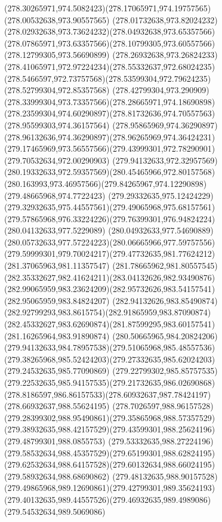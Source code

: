 {{		\curveto(278.30265971,974.5082423)(278.17065971,974.19757565)(278.00532638,973.90557565)
		\curveto(278.01732638,973.82024232)(278.02932638,973.73624232)(278.04932638,973.65357566)
		\curveto(278.07865971,973.63357566)(278.10799305,973.60557566)(278.12799305,973.56690899)
		\curveto(278.26932638,973.26824233)(278.41065971,972.97224234)(278.55332637,972.68024235)
		\curveto(278.5466597,972.73757568)(278.53599304,972.79624235)(278.52799304,972.85357568)
		\curveto(278.42799304,973.290909)(278.33999304,973.73357566)(278.28665971,974.18690898)
		\curveto(278.23599304,974.60290897)(278.81732636,974.70557563)(278.95599303,974.36157564)
		\curveto(278.95865969,974.36290897)(278.96132636,974.36290897)(278.96265969,974.36424231)
		\curveto(279.17465969,973.56557566)(279.43999301,972.78290901)(279.70532634,972.00290903)
		\curveto(279.94132633,972.32957569)(280.19332633,972.59357569)(280.45465966,972.80157568)
		\curveto(280.163993,973.46957566)(279.84265967,974.12290898)(279.48665968,974.7722423)
		\curveto(279.29332635,975.12424229)(279.32932635,975.44557561)(279.49065968,975.68157561)
		\curveto(279.57865968,976.33224226)(279.76399301,976.94824224)(280.04132633,977.5229089)
		\curveto(280.04932633,977.54690889)(280.05732633,977.57224223)(280.06665966,977.59757556)
		\curveto(279.59999301,979.70024217)(279.47732635,981.77624212)(281.37065963,981.11357547)
		\curveto(281.78665962,981.80557545)(282.35332627,982.41624211)(283.04132626,982.93490876)
		\curveto(282.99065959,983.23624209)(282.95732626,983.54157541)(282.95065959,983.84824207)
		\curveto(282.94132626,983.85490874)(282.92799293,983.8615754)(282.91865959,983.87090874)
		\curveto(282.45332627,983.62690874)(281.87599295,983.60157541)(281.16265964,983.91890874)
		\curveto(280.50665965,984.20824206)(279.94132633,984.78957538)(279.51065968,985.48557536)
		\curveto(279.38265968,985.52424203)(279.27332635,985.62024203)(279.24532635,985.77090869)
		\curveto(279.22799302,985.85757535)(279.22532635,985.94157535)(279.21732635,986.02690868)
		\curveto(278.8186597,986.86157533)(278.60932637,987.78424197)(278.66932637,988.55624195)
		\curveto(278.7026597,988.96157528)(279.28399302,988.95490861)(279.35865968,988.57357529)
		\curveto(279.38932635,988.42157529)(279.43599301,988.25624196)(279.48799301,988.0855753)
		\curveto(279.53332635,988.27224196)(279.58532634,988.45357529)(279.65199301,988.62824195)
		\curveto(279.62532634,988.64157528)(279.60132634,988.66024195)(279.58932634,988.68690862)
		\curveto(279.48132635,988.90157528)(279.49865968,989.12690861)(279.42799301,989.35624193)
		\curveto(279.40132635,989.44557526)(279.46932635,989.4989086)(279.54532634,989.5069086)
}}

